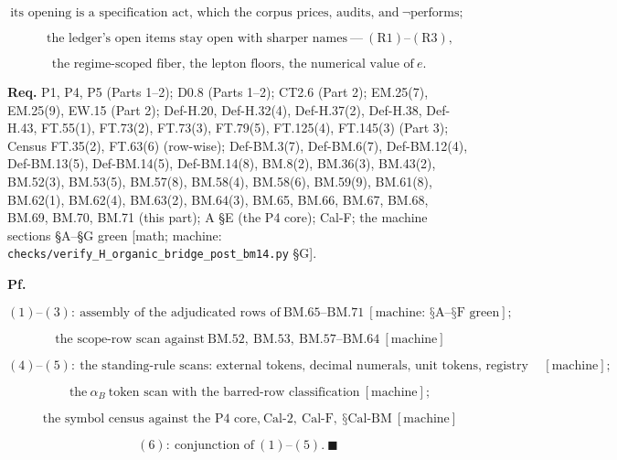 \documentclass[11pt,openany]{report}
\theoremstyle{canonplain}
\theoremstyle{canondef}
\begin{document}
\[
\text{its opening is a specification act, which the corpus prices, audits, and}\ \neg\text{performs};
\]

\[
\qquad \text{the ledger's open items stay open with sharper names}\ —\ (\mathrm R1)\text{--}(\mathrm R3),
\]

\[
\ \text{the regime-scoped fiber, the lepton floors, the numerical value of}\ e.
\]

\textbf{Req.} P1, P4, P5 (Parts 1–2); D0.8 (Parts 1–2); CT2.6 (Part 2); EM.25(7), EM.25(9), EW.15 (Part 2); Def-H.20, Def-H.32(4), Def-H.37(2), Def-H.38, Def-H.43, FT.55(1), FT.73(2), FT.73(3), FT.79(5), FT.125(4), FT.145(3) (Part 3); Census FT.35(2), FT.63(6) (row-wise); Def-BM.3(7), Def-BM.6(7), Def-BM.12(4), Def-BM.13(5), Def-BM.14(5), Def-BM.14(8), BM.8(2), BM.36(3), BM.43(2), BM.52(3), BM.53(5), BM.57(8), BM.58(4), BM.58(6), BM.59(9), BM.61(8), BM.62(1), BM.62(4), BM.63(2), BM.64(3), BM.65, BM.66, BM.67, BM.68, BM.69, BM.70, BM.71 (this part); A §E (the P4 core); Cal-F; the machine sections §A–§G green [math; machine: \texttt{checks/\allowbreak{}verify\_\allowbreak{}H\_\allowbreak{}organic\_\allowbreak{}bridge\_\allowbreak{}post\_\allowbreak{}bm14.py} §G].

\textbf{Pf.}

\[
(1)\text{--}(3):\ \text{assembly of the adjudicated rows of}\ \mathrm{BM.65}\text{--}\mathrm{BM.71}\ [\text{machine: §A--§F green}];
\]

\[
\qquad \text{the scope-row scan against}\ \mathrm{BM.52},\ \mathrm{BM.53},\ \mathrm{BM.57}\text{--}\mathrm{BM.64}\ [\text{machine}]
\]

\[
(4)\text{--}(5):\ \text{the standing-rule scans: external tokens, decimal numerals, unit tokens, registry tokens, declaration lines}\ [\text{machine}];
\]

\[
\qquad \text{the}\ \alpha_B\ \text{token scan with the barred-row classification}\ [\text{machine}];
\]

\[
\qquad \text{the symbol census against the P4 core,}\ \mathrm{Cal\text{-}2},\ \mathrm{Cal\text{-}F},\ \text{§Cal-BM}\ [\text{machine}]
\]

\[
(6):\ \text{conjunction of}\ (1)\text{--}(5). \ \blacksquare
\]
\end{document}
